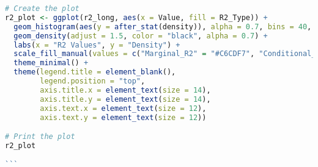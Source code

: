 \begin{lstlisting}[language=R, caption=Usage of the BayesianImpGLMM package with plots and examples.]
# Create the plot
r2_plot <- ggplot(r2_long, aes(x = Value, fill = R2_Type)) +
  geom_histogram(aes(y = after_stat(density)), alpha = 0.7, bins = 40, color = "black") +
  geom_density(adjust = 1.5, color = "black", alpha = 0.7) +
  labs(x = "R2 Values", y = "Density") +
  scale_fill_manual(values = c("Marginal_R2" = "#C6CDF7", "Conditional_R2" = "#E6C6DF")) +
  theme_minimal() +
  theme(legend.title = element_blank(),
        legend.position = "top",
        axis.title.x = element_text(size = 14),
        axis.title.y = element_text(size = 14),
        axis.text.x = element_text(size = 12),
        axis.text.y = element_text(size = 12))

# Print the plot
r2_plot

```

\end{lstlisting}